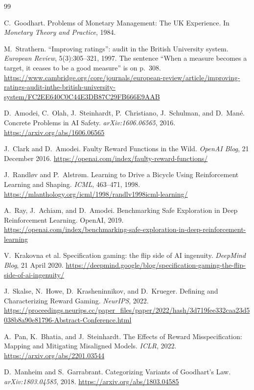 \documentclass[11pt]{article}
\begin{document}
\begin{thebibliography}{99}

 C.~Goodhart. Problems of Monetary Management: The UK
Experience. In \emph{Monetary Theory and Practice}, 1984.

 M.~Strathern. ``Improving ratings'': audit in the
British University system. \emph{European Review}, 5(3):305--321, 1997. The
sentence ``When a measure becomes a target, it ceases to be a good measure''
is on p.~308.
\url{https://www.cambridge.org/core/journals/european-review/article/improving-ratings-audit-inthe-british-university-system/FC2EE640C0C44E3DB87C29FB666E9AAB}

 D.~Amodei, C.~Olah, J.~Steinhardt, P.~Christiano,
J.~Schulman, and D.~Man\'e. Concrete Problems in AI Safety.
\emph{arXiv:1606.06565}, 2016. \url{https://arxiv.org/abs/1606.06565}

 J.~Clark and D.~Amodei. Faulty Reward Functions in the
Wild. \emph{OpenAI Blog}, 21 December 2016.
\url{https://openai.com/index/faulty-reward-functions/}

 J.~Randl{\o}v and P.~Alstr{\o}m. Learning to Drive a
Bicycle Using Reinforcement Learning and Shaping. \emph{ICML}, 463--471, 1998.
\url{https://mlanthology.org/icml/1998/randlv1998icml-learning/}

 A.~Ray, J.~Achiam, and D.~Amodei. Benchmarking Safe
Exploration in Deep Reinforcement Learning. OpenAI, 2019.
\url{https://openai.com/index/benchmarking-safe-exploration-in-deep-reinforcement-learning}

 V.~Krakovna et al. Specification gaming: the flip side of
AI ingenuity. \emph{DeepMind Blog}, 21 April 2020.
\url{https://deepmind.google/blog/specification-gaming-the-flip-side-of-ai-ingenuity/}

 J.~Skalse, N.~Howe, D.~Krasheninnikov, and D.~Krueger.
Defining and Characterizing Reward Gaming. \emph{NeurIPS}, 2022.
\url{https://proceedings.neurips.cc/paper_files/paper/2022/hash/3d719fee332caa23d5038b8a90e81796-Abstract-Conference.html}

 A.~Pan, K.~Bhatia, and J.~Steinhardt. The Effects of Reward
Misspecification: Mapping and Mitigating Misaligned Models. \emph{ICLR}, 2022.
\url{https://arxiv.org/abs/2201.03544}

 D.~Manheim and S.~Garrabrant. Categorizing Variants of
Goodhart's Law. \emph{arXiv:1803.04585}, 2018.
\url{https://arxiv.org/abs/1803.04585}


\end{thebibliography}
\end{document}
